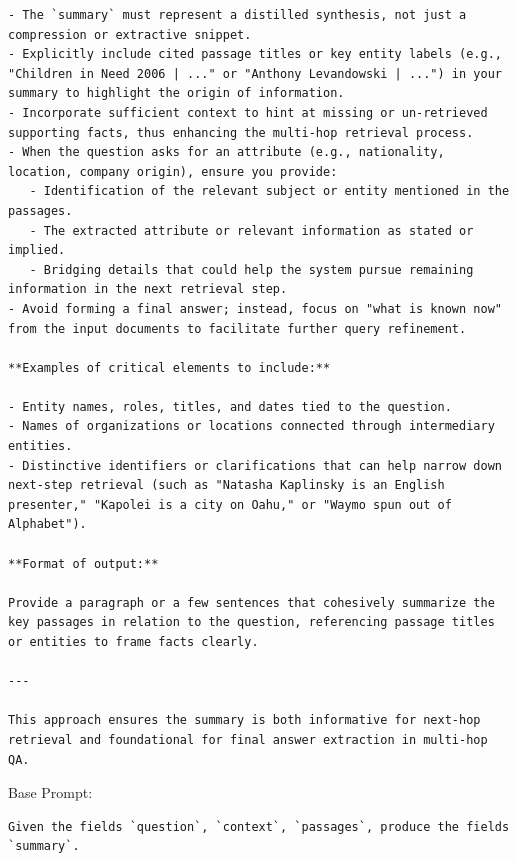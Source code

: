 \begin{instructbox}
\begin{lstlisting}[breakindent=0pt, breaklines=true, breakatwhitespace=true, frame=single, backgroundcolor=\color{blue!10}]
- The `summary` must represent a distilled synthesis, not just a compression or extractive snippet.
- Explicitly include cited passage titles or key entity labels (e.g., "Children in Need 2006 | ..." or "Anthony Levandowski | ...") in your summary to highlight the origin of information.
- Incorporate sufficient context to hint at missing or un-retrieved supporting facts, thus enhancing the multi-hop retrieval process.
- When the question asks for an attribute (e.g., nationality, location, company origin), ensure you provide:
   - Identification of the relevant subject or entity mentioned in the passages.
   - The extracted attribute or relevant information as stated or implied.
   - Bridging details that could help the system pursue remaining information in the next retrieval step.
- Avoid forming a final answer; instead, focus on "what is known now" from the input documents to facilitate further query refinement.

**Examples of critical elements to include:**

- Entity names, roles, titles, and dates tied to the question.
- Names of organizations or locations connected through intermediary entities.
- Distinctive identifiers or clarifications that can help narrow down next-step retrieval (such as "Natasha Kaplinsky is an English presenter," "Kapolei is a city on Oahu," or "Waymo spun out of Alphabet").

**Format of output:**

Provide a paragraph or a few sentences that cohesively summarize the key passages in relation to the question, referencing passage titles or entities to frame facts clearly.

---

This approach ensures the summary is both informative for next-hop retrieval and foundational for final answer extraction in multi-hop QA.
\end{lstlisting}
\end{instructbox}\begin{instructbox}
Base Prompt:
\begin{lstlisting}[breakindent=0pt, breaklines=true, breakatwhitespace=true, frame=single, backgroundcolor=\color{gray!10}]
Given the fields `question`, `context`, `passages`, produce the fields `summary`.
\end{lstlisting}


\end{instructbox}
